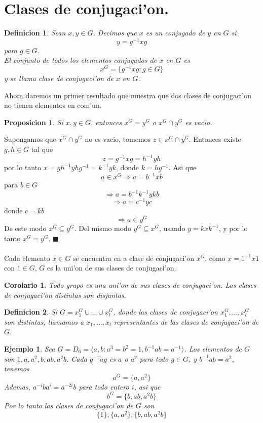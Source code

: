 \documentclass[a4paper,openright,12pt]{book}
\numberwithin{equation}{section} %
\newtheorem{proposicion}{Proposicion}[section] %
\newtheorem{corolario}{Corolario}[section] %
\newtheorem{definicion}{Definicion}[section] %
\newtheorem{ejemplo}{Ejemplo}[section] %
\newenvironment{proof}{\noindent{\it Demostracion:}}{\hfill$\blacksquare$} %
\begin{document}
\section{Clases de conjugaci'on.}
\begin{definicion}
Sean $x, y \in G$. Decimos que $x$ es un conjugado de $y$ en $G$ si 
\[
y=g^{-1}xg
\]
para $g \in G$.\\
El conjunto de todos los elementos conjugados de $x$ en $G$ es
\[
x^{G}=\{g^{-1}xg : g \in G \}
\]
y se llama clase de conjugaci'on de $x$ en $G$.
\end{definicion}
Ahora daremos un primer resultado que muestra que dos clases de conjugaci'on no tienen elementos en com'un.
\begin{proposicion}
Si $x, y \in G$, entonces $x^{G}=y^{G}$ o $x^{G} \cap y^{G}$ es vacio.
\end{proposicion} 
\begin{proof}
Supongamos que $x^{G} \cap y^{G}$ no es vacio, tomemos $z \in x^{G} \cap y^{G}$. Entonces existe $g, h \in G$ tal que 
\[
z=g^{-1}xg = h^{-1}yh
\]
por lo tanto $x=gh^{-1}yhg^{-1}=k^{-1}yk $, donde $k=hg^{-1}$. Asi que
\[
a \in x^{G} \Rightarrow a=b^{-1}xb
\]
para $b \in G$
\[
\Rightarrow a=b^{-1}k^{-1}ykb
\]
\[
\Rightarrow a=c^{-1}yc
\]
donde $c=kb$ 
\[
\Rightarrow a \in y^{G}
\]
De este modo $x^{G} \subseteq y^{G}$. Del mismo modo $y^{G} \subseteq x^{G}$, usando $y=kxk^{-1}$, y por lo tanto $x^{G}=y^{G}$.
\end{proof}\\
\\
Cada elemento $x \in G$ se encuentra en a clase de conjugaci'on $x^{G}$, como $x=1^{-1}x1$ con $1 \in G$, $G$ es la uni'on de sus clases de conjugaci'on.
\begin{corolario}
Todo grupo es una uni'on de sus clases de conjugaci'on. Las clases de conjugaci'on distintas son disjuntas.
\end{corolario}
\begin{definicion}
Si $G=x_{1}^{G} \cup \ldots \cup x_{l}^{G}$, donde las clases de conjugaci'on $x_{1}^{G}, \ldots , x_{l}^{G}$ son distintas, llamamos a $x_{1}, \ldots , x_{l}$ representantes de las clases de conjugaci'on de $G$.
\end{definicion}
\begin{ejemplo}
Sea $G=D_{6}=\langle a, b: a^{3}=b^{2}=1, b^{-1}ab=a^{-1} \rangle$. Los elementos de $G$ son $1, a, a^{2}, b, ab, a^{2}b$. Cada $g^{-1}ag$ es $a$ o $a^{2}$ para todo $g \in G$, y $b^{-1}ab=a^{2}$, tenemos
\[
a^{G}=\{ a, a^{2} \}
\]
Ademas, $a^{-i}ba^{i}=a^{-2i}b$ para todo entero $i$, asi que
\[
b^{G}= \{ b, ab, a^{2}b \}
\]
Por lo tanto las clases de conjugaci'on de $G$ son
\[
\{ 1 \}, \{ a, a^{2} \}, \{ b, ab, a^{2}b \}
\]
\end{ejemplo}
\end{document}
